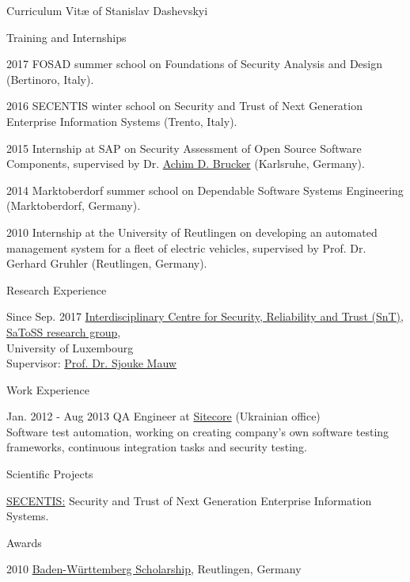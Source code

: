 \documentclass[11pt]{custom-style}
\begin{document}
\begin{cv}{Curriculum Vit\ae{} of Stanislav Dashevskyi}
  \begin{cvlist}{Training and Internships}
  \item[2017] FOSAD summer school on Foundations of Security Analysis and Design (Bertinoro, Italy).
  \item[2016] SECENTIS winter school on Security and Trust of Next Generation Enterprise Information Systems (Trento, Italy).
  \item[2015] Internship at SAP on Security Assessment of Open Source Software Components, supervised by Dr. \href{https://www.brucker.ch}{Achim D. Brucker} (Karlsruhe, Germany).
  \item[2014] Marktoberdorf summer school on Dependable Software Systems Engineering (Marktoberdorf, Germany).
  \item[2010] Internship at the University of Reutlingen on developing an automated management system for a fleet of electric vehicles, supervised by Prof. Dr. Gerhard Gruhler (Reutlingen, Germany).
  \end{cvlist}  

  \begin{cvlist}{Research Experience}
  \item[Since Sep. 2017] \href{https://wwwfr.uni.lu/snt}{Interdisciplinary Centre for Security, Reliability and Trust (SnT)},\\
    \href{http://satoss.uni.lu/}{SaToSS research group},\\
    University of Luxembourg\\
    Supervisor:
    \href{http://satoss.uni.lu/members/sjouke/}{Prof. Dr. Sjouke Mauw}
  \end{cvlist}

  \begin{cvlist}{Work Experience}
  \item[Jan. 2012 - Aug 2013] QA Engineer at \href{https://www.sitecore.com/company}{Sitecore} (Ukrainian office)\\
      Software test automation, working on creating company's own software testing frameworks, 
      continuous integration tasks and security testing.
  \end{cvlist}
  
  \begin{cvlist}{Scientific Projects}
  \item \href{http://www.secentis.eu/}{SECENTIS:} Security and
    Trust of Next Generation Enterprise Information Systems.
  \end{cvlist}
  
  \begin{cvlist}{Awards}
  \item[2010] \href{https://www.bw-stipendium.de/en/home/}{Baden-W{\"u}rttemberg
      Scholarship}, Reutlingen, Germany
  \end{cvlist}


\end{cv}
\end{document}
